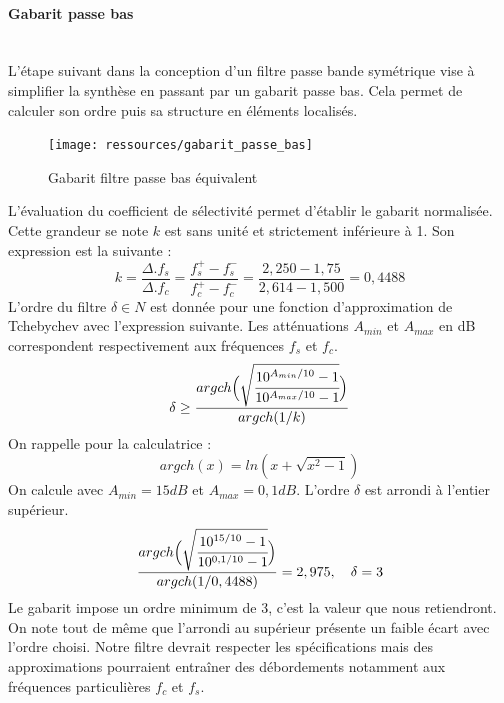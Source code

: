 \documentclass[french]{article}
\begin{document}
\paragraph{Gabarit passe bas} ~~\\ \noindent
L'étape suivant dans la conception d'un filtre passe bande symétrique vise à simplifier la synthèse en passant par un gabarit passe bas. Cela permet de calculer son ordre puis sa structure en éléments localisés.
\begin{figure}[H]
	\centering
	\texttt{[image: ressources/gabarit\_passe\_bas]}
	\caption{Gabarit filtre passe bas équivalent}
	\label{fig:gabaritpassepas}
\end{figure}
L'évaluation du coefficient de sélectivité permet d'établir le gabarit normalisée. Cette grandeur se note $k$ est sans unité et strictement inférieure à 1. Son expression est la suivante :
\begin{equation}
	k=\frac{\Delta.f_s}{\Delta.f_c}=\frac{f_s^+-f_s^-}{f_c^+-f_c^-}=\frac{2,250-1,75}{2,614-1,500}=0,4488
\end{equation}
L'ordre du filtre $\delta \in N$ est donnée pour une fonction d'approximation de Tchebychev avec l'expression suivante. Les atténuations $A_{min}$ et $A_{max}$ en dB correspondent respectivement aux fréquences $f_s$ et $f_c$.
\begin{equation}
\delta \geq \frac{argch
	\Big( \sqrt{\cfrac{10^{A_{min}/10}-1}{10^{A_{max}/10}-1}}
	\Big)
}{argch(1/k)}
\end{equation}
On rappelle pour la calculatrice :
\begin{equation}
argch(x)=ln(x+\sqrt{x^2-1})
\end{equation}
On calcule avec $A_{min} = 15dB$ et $A_{max} = 0,1dB$. L'ordre $\delta$ est arrondi à l'entier supérieur.
\begin{equation}
\frac{argch
	\Big( \sqrt{\cfrac{10^{15/10}-1}{10^{0,1/10}-1}}
	\Big)
}{argch(1/0,4488)} = 2,975, \quad \delta = 3
\end{equation}
Le gabarit impose un ordre minimum de 3, c'est la valeur que nous retiendront. On note tout de même que l'arrondi au supérieur présente un faible écart avec l'ordre choisi. Notre filtre devrait respecter les spécifications mais des approximations pourraient entraîner des débordements notamment aux fréquences particulières $f_c$ et $f_s$.
\end{document}
